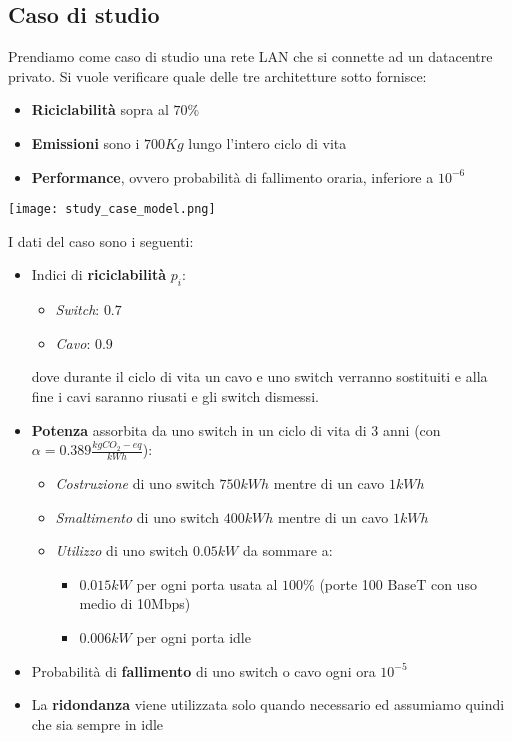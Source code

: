\subsection{Caso di studio}
Prendiamo come caso di studio una rete LAN che si connette ad un datacentre privato. Si vuole verificare quale delle tre architetture sotto fornisce:
\begin{itemize}
	\item \textbf{Riciclabilità} sopra al $70\%$
	\item \textbf{Emissioni} sono i $700 Kg$ lungo l'intero ciclo di vita
	\item \textbf{Performance}, ovvero probabilità di fallimento oraria, inferiore a $10^{-6}$
\end{itemize}
\begin{center}
	\texttt{[image: study\_case\_model.png]}
\end{center}
I dati del caso sono i seguenti:
\begin{itemize}
	\item Indici di \textbf{riciclabilità} $p_i$:
	\begin{itemize}
		\item \emph{Switch}: $0.7$
		\item \emph{Cavo}: $0.9$
	\end{itemize}
	dove durante il ciclo di vita un cavo e uno switch verranno sostituiti e alla fine i cavi saranno riusati e gli switch dismessi.
	\item \textbf{Potenza} assorbita da uno switch in un ciclo di vita di $3$ anni (con $\alpha = 0.389  \frac{kg CO_2-eq}{kWh}$):
	\begin{itemize}
		\item \emph{Costruzione} di uno switch $750kWh$ mentre di un cavo $1kWh$
		\item \emph{Smaltimento} di uno switch $400kWh$ mentre di un cavo $1kWh$
		\item \emph{Utilizzo} di uno switch $0.05kW$ da sommare a:
		\begin{itemize}
			\item $0.015kW$ per ogni porta usata al $100\%$ (porte 100 BaseT con uso medio di 10Mbps)
			\item $0.006kW$ per ogni porta idle 
		\end{itemize}
	\end{itemize}
	\item Probabilità di \textbf{fallimento} di uno switch o cavo ogni ora $10^{-5}$
	\item La \textbf{ridondanza} viene utilizzata solo quando necessario ed assumiamo quindi che sia sempre in idle
\end{itemize}
